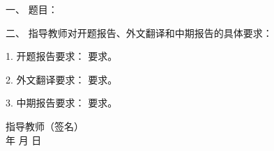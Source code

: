 \newpage

\thispagestyle{empty}

{
\setlength{\parindent}{0em}
\renewcommand{\baselinestretch}{2}
\songti\sihao\bfseries

一、 \; 题目： \; \underline{\makebox[24em]{\zjutitlec}}

\vspace{2em}

二、 \; 指导教师对开题报告、外文翻译和中期报告的具体要求：

1. \; 开题报告要求： \; 要求。

2. \; 外文翻译要求： \; 要求。

3. \; 中期报告要求： \; 要求。

\vspace{8cm}
}

{
\songti\xiaosi\bfseries
\begin{flushright}
  指导教师（签名） \; \underline{\hspace{6em}} \\
  年 \qquad 月 \qquad 日
\end{flushright}
}

